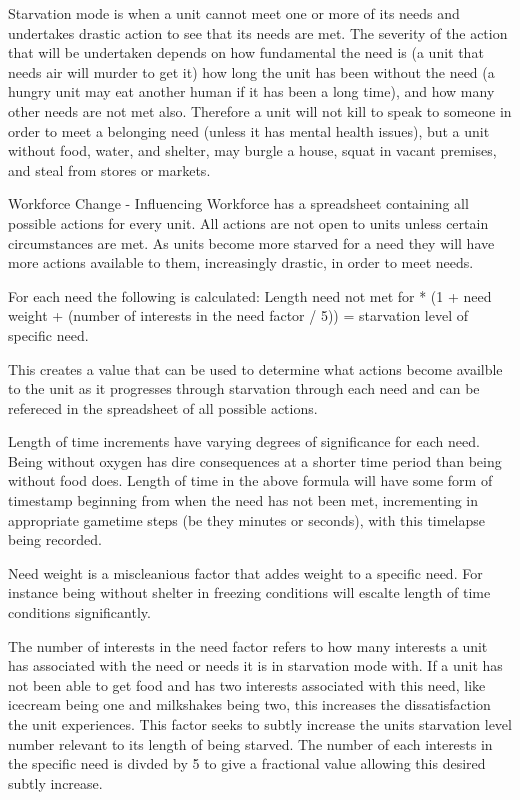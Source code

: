 

Starvation mode is when a unit cannot meet one or more of its needs and undertakes drastic action to see that its needs are met. The severity of the action that will be undertaken depends on how fundamental the need is (a unit that needs air will murder to get it) how long the unit has been without the need (a hungry unit may eat another human if it has been a long time), and how many other needs are not met also. Therefore a unit will not kill to speak to someone in order to meet a belonging need (unless it has mental health issues), but a unit without food, water, and shelter, may burgle a house, squat in vacant premises, and steal from stores or markets.

Workforce Change - Influencing Workforce has a spreadsheet containing all possible actions for every unit. All actions are not open to units unless certain circumstances are met. As units become more starved for a need they will have more actions available to them, increasingly drastic, in order to meet needs. 

For each need the following is calculated:
Length need not met for * (1 + need weight + (number of interests in the need factor / 5)) = starvation level of specific need.

This creates a value that can be used to determine what actions become availble to the unit as it progresses through starvation through each need and can be refereced in the spreadsheet of all possible actions.

Length of time increments have varying degrees of significance for each need. Being without oxygen has dire consequences at a shorter time period than being without food does. Length of time in the above formula will have some form of timestamp beginning from when the need has not been met, incrementing in appropriate gametime steps (be they minutes or seconds), with this timelapse being recorded.

Need weight is a miscleanious factor that addes weight to a specific need. For instance being without shelter in freezing conditions will escalte length of time conditions significantly. 

The number of interests in the need factor refers to how many interests a unit has associated with the need or needs it is in starvation mode with. If a unit has not been able to get food and has two interests associated with this need, like icecream being one and milkshakes being two, this increases the dissatisfaction the unit experiences. This factor seeks to subtly increase the units starvation level number relevant to its length of being starved. The number of each interests in the specific need is divded by 5 to give a fractional value allowing this desired subtly increase.


